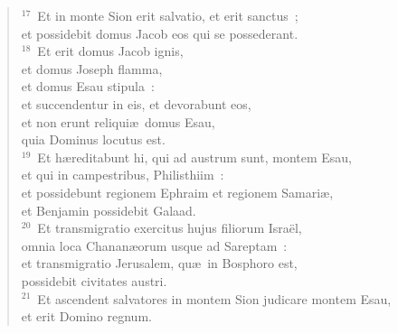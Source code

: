 \begin{flushleft}
\begin{verse}
${}^{17}$~Et in monte Sion erit salvatio, et erit sanctus~;\\ et possidebit domus Jacob eos qui se possederant.\\
${}^{18}$~Et erit domus Jacob ignis,\\ et domus Joseph flamma,\\ et domus Esau stipula~:\\ et succendentur in eis, et devorabunt eos,\\ et non erunt reliqui\ae\ domus Esau,\\ quia Dominus locutus est.\\
${}^{19}$~Et h\ae reditabunt hi, qui ad austrum sunt, montem Esau,\\ et qui in campestribus, Philisthiim~:\\ et possidebunt regionem Ephraim et regionem Samari\ae ,\\ et Benjamin possidebit Galaad.\\
${}^{20}$~Et transmigratio exercitus hujus filiorum Isra\"el,\\ omnia loca Chanan\ae orum usque ad Sareptam~:\\ et transmigratio Jerusalem, qu\ae\ in Bosphoro est,\\ possidebit civitates austri.\\
${}^{21}$~Et ascendent salvatores in montem Sion judicare montem Esau,\\ et erit Domino regnum.\end{verse}\end{flushleft}


